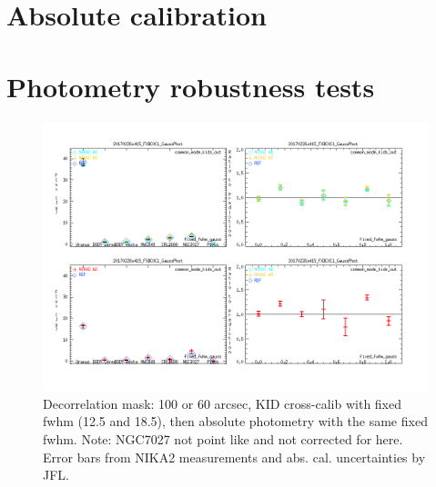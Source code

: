 \documentclass[a4paper, 11pt]{article} %
\begin{document}
\clearpage
\section{Absolute calibration}
\label{se:calibration}


\label{se:cal_HA}


\label{se:ref_flux}


\label{se:cal_JFL}


\clearpage
\section{Photometry robustness tests}
\label{se:photometry}

\begin{figure}
\begin{center}
\includegraphics[clip, angle=0, scale = 0.4]{Figures/Calibrators_N2R9_20170226s415_FXDC0C1_GaussPhotFluxType_fixed_fwhm_gauss.png}
\caption{Decorrelation mask: 100 or 60 arcsec, KID cross-calib with fixed fwhm
  (12.5 and 18.5), then absolute photometry with the same fixed fwhm. Note:
  NGC7027 not point like and not corrected for here. Error bars from NIKA2
  measurements and abs. cal. uncertainties by JFL.}
\label{fig:fov}
\end{center}
\end{figure}
\end{document}

